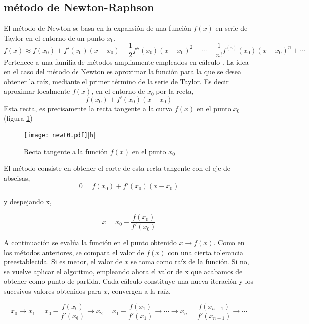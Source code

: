\subsection{método de Newton-Raphson}
El método de Newton se basa en la expansión de una función $f(x)$ en serie de Taylor en el entorno de un punto $x_0$,
\begin{equation*}
f(x)\approx f(x_0)+f'(x_0)(x-x_0)+\frac{1}{2}f''(x_0)(x-x_0)^2+\cdots+\frac{1}{n!}f^{(n)}(x_0)(x-x_0)^n+\cdots
\end{equation*}
 Pertenece a una familia de métodos ampliamente empleados en cálculo . La idea en el caso del método de Newton es aproximar la función para la que se desea obtener la raíz, mediante el primer término de la serie de Taylor. Es decir aproximar localmente $f(x)$, en el entorno de $x_0$ por la recta,
\begin{equation*}
 f(x_0)+f'(x_0)(x-x_0)
\end{equation*}
Esta recta, es precisamente la recta tangente a la curva $f(x)$ en el punto $x_0$ (figura \ref{fig:newton1})
\begin{figure}[h]
\centering
\texttt{[image: newt0.pdf]}[h]
\caption{Recta tangente a la función $f(x)$ en el punto $x_0$}
\label{fig:newton1}
\end{figure}

El método consiste en obtener el corte de esta recta tangente con el eje de abscisas,
\begin{equation*}
0= f(x_0)+f'(x_0)(x-x_0)
\end{equation*}

y despejando x,

\begin{equation*}
x=x_0-\frac{f(x_0)}{f'(x_0)}
\end{equation*}

A continuación se evalúa la función en el punto obtenido $x\rightarrow f(x)$. Como en los métodos anteriores, se compara el valor de $f(x)$ con una cierta tolerancia preestablecida. Si es menor, el valor de $x$ se toma como raíz de la función. Si no, se vuelve aplicar el algoritmo, empleando ahora el valor de x que acabamos de obtener como punto de partida. Cada cálculo constituye una nueva iteración y los sucesivos valores obtenidos para $x$, convergen a la raíz,

\begin{equation*}
x_0\rightarrow x_1=x_0-\frac{f(x_0)}{f'(x_0)}\rightarrow x_2=x_1-\frac{f(x_1)}{f'(x_1)}\rightarrow  \cdots \rightarrow x_n=\frac{f(x_{n-1})}{f'(x_{n-1})}\rightarrow \cdots
\end{equation*}

